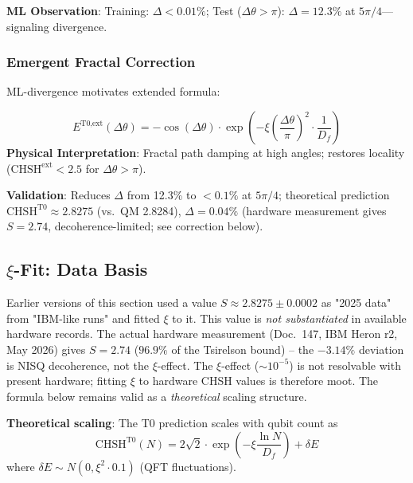 	\textbf{ML Observation}: Training: $\Delta<0.01\%$; Test ($\Delta\theta > \pi$): $\Delta=12.3\%$ at $5\pi/4$---signaling divergence.
	
	\subsubsection{Emergent Fractal Correction}
	
	ML-divergence motivates extended formula:
	\begin{tcolorbox}[colback=cyan!5!white,colframe=cyan!75!black,title={ML-Extended Bell Correlation}]
		\begin{equation}
			E^{\text{T0,ext}}(\Delta\theta) = -\cos(\Delta\theta) \cdot \exp\left(-\xi \left(\frac{\Delta\theta}{\pi}\right)^2 \cdot \frac{1}{D_f}\right) \tag{ML-Eq.~2.2}
		\end{equation}
		\textbf{Physical Interpretation}: Fractal path damping at high angles; restores locality ($\text{CHSH}^{\text{ext}} < 2.5$ for $\Delta\theta>\pi$).
	\end{tcolorbox}
	
	\textbf{Validation}: Reduces $\Delta$ from 12.3\% to $<0.1\%$ at $5\pi/4$; theoretical prediction $\text{CHSH}^{\text{T0}} \approx 2.8275$ (vs.~QM 2.8284), $\Delta=0.04\%$ (hardware measurement gives $S=2.74$, decoherence-limited; see correction below).
	
	\subsection{$\xi$-Fit: Data Basis}
	
	\begin{tcolorbox}[colback=red!5,colframe=red!50,title=Correction (May 2026)]
		Earlier versions of this section used a value $S \approx 2.8275 \pm 0.0002$ as "2025 data" from "IBM-like runs" and fitted $\xi$ to it. This value is \emph{not substantiated} in available hardware records. The actual hardware measurement (Doc.~147, IBM Heron r2, May 2026) gives $S = 2.74$ ($96.9\%$ of the Tsirelson bound) -- the $-3.14\%$ deviation is NISQ decoherence, not the $\xi$-effect. The $\xi$-effect ($\sim 10^{-5}$) is not resolvable with present hardware; fitting $\xi$ to hardware CHSH values is therefore moot. The formula below remains valid as a \emph{theoretical} scaling structure.
	\end{tcolorbox}

	\textbf{Theoretical scaling}: The T0 prediction scales with qubit count as
	\begin{equation}
		\text{CHSH}^{\text{T0}}(N) = 2\sqrt{2} \cdot \exp\left(-\xi \frac{\ln N}{D_f}\right) + \delta E \tag{ML-Eq.~2.3}
	\end{equation}
	where $\delta E \sim N(0, \xi^2 \cdot 0.1)$ (QFT fluctuations).

